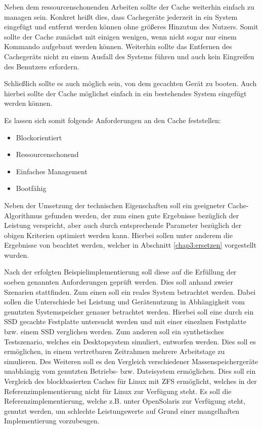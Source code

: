 Neben dem ressourcenschonenden Arbeiten sollte der Cache weiterhin einfach zu managen sein. Konkret heißt dies, dass Cachegeräte jederzeit in ein System
eingefügt und entfernt werden können ohne größeres Hinzutun des Nutzers. Somit sollte der Cache zunächst mit einigen wenigen, wenn nicht sogar nur einem
Kommando aufgebaut werden können. Weiterhin sollte das Entfernen des Cachegeräts nicht zu einem Ausfall des Systems führen und auch kein Eingreifen des Benutzers
erfordern.

Schließlich sollte es auch möglich sein, von dem gecachten Gerät zu booten. Auch hierbei sollte der Cache möglichst einfach in ein bestehendes System eingefügt
werden können.

Es lassen sich somit folgende Anforderungen an den Cache feststellen:

\begin{itemize}
  \item Blockorientiert
  \item Ressourcenschonend
  \item Einfaches Management
  \item Bootfähig
\end{itemize}

Neben der Umsetzung der technischen Eigenschaften soll ein geeigneter Cache-Algorithmus gefunden werden, der zum einen gute Ergebnisse bezüglich der Leistung
verspricht, aber auch durch entsprechende Parameter bezüglich der obigen Kriterien optimiert werden kann. Hierbei sollen unter anderem die Ergebnisse von 
\textcite{cache1} beachtet werden, welcher in Abschnitt \ref{chap3:ersetzen} vorgestellt wurden.

Nach der erfolgten Beispielimplementierung soll diese auf die Erfüllung der soeben genannten Anforderungen geprüft werden. Dies soll anhand zweier Szenarien
stattfinden. Zum einen soll ein reales System betrachtet werden. Dabei sollen die Unterschiede bei Leistung und Gerätenutzung in Abhängigkeit vom genutzten
Systemspeicher genauer betrachtet werden. Hierbei soll eine durch ein \ac{SSD} gecachte Festplatte untersucht werden und mit einer einezlnen Festplatte bzw.
einem \ac{SSD} verglichen werden. Zum anderen soll ein synthetisches Testszenario, welches ein Desktopsystem simuliert, entworfen werden. Dies soll es
ermöglichen, in einem vertretbaren Zeitrahmen mehrere Arbeitstage zu simulieren. Des Weiteren soll es den Vergleich verschiedener Massenspeichergeräte unabhängig
vom genutzten Betriebs- bzw. Dateisystem ermöglichen. Dies soll ein Vergleich des blockbasierten Caches für Linux mit ZFS ermöglicht, welches in der
Referenzimplementierung nicht für Linux zur Verfügung steht. Es soll die Referenzimplementierung, welche z.B. unter OpenSolaris \cite{solaris} zur Verfügung
steht, genutzt werden, um schlechte Leistungswerte auf Grund einer mangelhaften Implementierung vorzubeugen.

